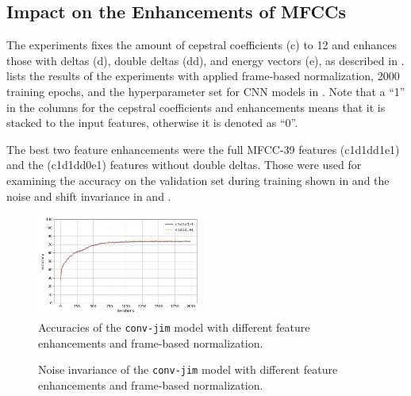 \subsection{Impact on the Enhancements of MFCCs}\label{sec:exp_fs_mfcc}
The experiments fixes the amount of cepstral coefficients (c) to 12 and enhances those with deltas (d), double deltas (dd), and energy vectors (e), as described in .
 lists the results of the experiments with applied frame-based normalization, 2000 training epochs, and the hyperparameter set for CNN models in .
Note that a \enquote{1} in the columns for the cepstral coefficients and enhancements means that it is stacked to the input features, otherwise it is denoted as \enquote{0}.

The best two feature enhancements were the full MFCC-39 features (c1d1dd1e1) and the (c1d1dd0e1) features without double deltas.
Those were used for examining the accuracy on the validation set during training shown in  and the noise and shift invariance in  and .
\begin{figure}[!ht]
  \centering
  \includegraphics[width=0.48\textwidth]{./5_exp/figs/exp_fs_mfcc_acc_conv-jim.png}
  \caption{Accuracies of the \texttt{conv-jim} model with different feature enhancements and frame-based normalization.}
  \label{fig:exp_fs_mfcc_tb_acc_conv-jim}
\end{figure}
\FloatBarrier
\noindent
\begin{figure}[!ht]
  \centering
  \qquad
  \caption{Noise invariance of the \texttt{conv-jim} model with different feature enhancements and frame-based normalization.}
  \label{fig:exp_fs_mfcc_tb_noise_conv-jim}
\end{figure}
